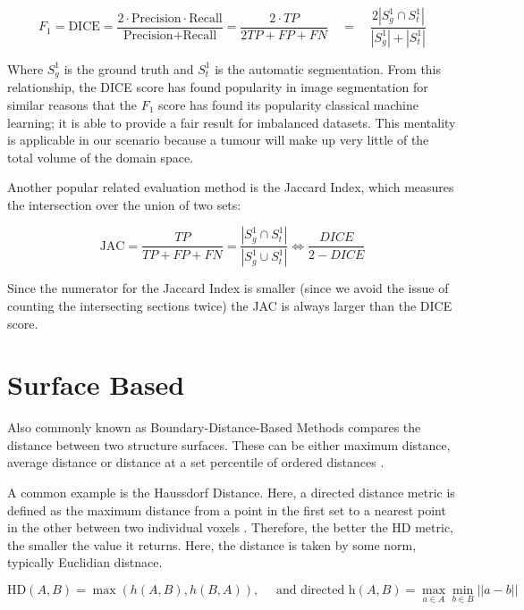 \documentclass[11pt,twoside]{report}
\begin{document}
\begin{equation*}
  F_1 = \text{DICE} = \frac{2 \cdot \text{Precision} \cdot \text{Recall}} {\text{Precision} + \text{Recall}} = \frac{2 \cdot TP}{2TP + FP + FN} \quad = \quad \frac{2|S_g^1\cap S_t^1|}{|S_g^1|+|S_t^1|}
\end{equation*}

Where $S_g^1$ is the ground truth and $S_t^1$ is the automatic segmentation. From this relationship, the DICE score has found popularity in image segmentation for similar reasons that the $F_1$ score has found its popularity classical machine learning; it is able to provide a fair result for imbalanced datasets. This mentality is applicable in our scenario because a tumour will make up very little of the total volume of the domain space.

Another popular related evaluation method is the Jaccard Index, which measures the intersection over the union of two sets:

\begin{equation*}
  \text{JAC} = \frac{TP}{TP+FP+FN} = \frac{|S_g^1\cap S_t^1|}{|S_g^1 \cup S_t^1|} \iff \frac{DICE}{2 - DICE}
\end{equation*}

Since the numerator for the Jaccard Index is smaller (since we avoid the issue of counting the intersecting sections twice) the JAC is always larger than the DICE score.

\section{Surface Based} \label{sect:surface-based}

Also commonly known as Boundary-Distance-Based Methods \cite{boundary-overlap-metrics} compares the distance between two structure
surfaces. These can be either maximum distance, average distance or distance at a set percentile of ordered distances \cite{evaluation-metrics}.

A common example is the Haussdorf Distance. Here, a directed distance metric is defined as the maximum distance from a point in the first set to a nearest point in the other between two individual voxels \cite{boundary-overlap-metrics}. Therefore, the better the HD metric, the smaller the value it returns. Here, the distance is taken by some norm, typically Euclidian distnace.

\begin{equation*}
  \text{HD}(A,B) = \max(h(A,B), h(B,A)), \quad \text{ and directed h}(A,B)=\max_{a\in A}\min_{b \in B} ||a-b||
\end{equation*}
\end{document}
